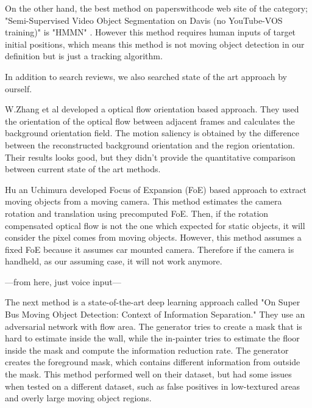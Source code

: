 \documentclass[10pt, twocolumn]{article}
\begin{document}
On the other hand, the best method on paperswithcode web site of the category; "Semi-Supervised Video Object Segmentation on Davis (no YouTube-VOS training)" is "HMMN" \cite{DBLP:journals/corr/abs-2109-11404}.
However this method requires human inputs of target initial positions, which means this method is not moving object detection in our definition but is just a tracking algorithm.

In addition to search reviews, we also searched state of the art approach by ourself.

W.Zhang et al \cite{Zhang_Sun_Yu_2020} developed a optical flow orientation based approach.
They used the orientation of the optical flow between adjacent frames and calculates the background orientation field.
The motion saliency is obtained by the difference between the reconstructed background orientation and the region orientation.
Their results looks good, but they didn't provide the quantitative comparison between current state of the art methods.

Hu an Uchimura \cite{hu2000} developed Focus of Expansion (FoE) based approach to extract moving objects from a moving camera.
This method estimates the camera rotation and translation using precomputed FoE.
Then, if the rotation compensated optical flow is not the one which expected for static objects, it will consider the pixel comes from moving objects.
However, this method assumes a fixed FoE because it assumes car mounted camera.
Therefore if the camera is handheld, as our assuming case, it will not work anymore.

---from here, just voice input---

The next method is a state-of-the-art deep learning approach called "On Super Bus Moving Object Detection: Context of Information Separation." They use an adversarial network with flow area. The generator tries to create a mask that is hard to estimate inside the wall, while the in-painter tries to estimate the floor inside the mask and compute the information reduction rate. The generator creates the foreground mask, which contains different information from outside the mask. This method performed well on their dataset, but had some issues when tested on a different dataset, such as false positives in low-textured areas and overly large moving object regions.
\end{document}
